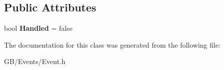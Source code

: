 \subsection*{Public Attributes}
\begin{DoxyCompactItemize}
\item 
\mbox{\label{class_g_b_1_1_event_a5abe6791ceb6a6e17e41b49965569bb8}} 
bool {\bfseries Handled} = false
\end{DoxyCompactItemize}


The documentation for this class was generated from the following file\+:\begin{DoxyCompactItemize}
\item 
G\+B/\+Events/Event.\+h\end{DoxyCompactItemize}
